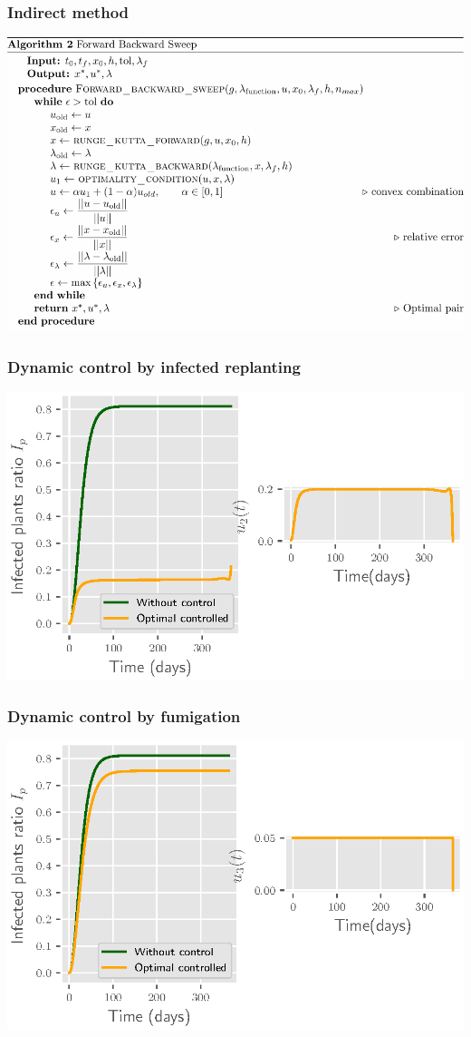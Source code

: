 	\begin{frame}[plain]\frametitle{Indirect method}
		\includegraphics[width=1\linewidth]{Feathergraphics/fbs_algorithm.pdf}
	\end{frame}
	
	\begin{frame}[plain]
		\frametitle{Dynamic control by infected replanting}
			\centering	
			\includegraphics[]{Feathergraphics/figure_1_tomato_one_control.eps}	
	\end{frame}

	\begin{frame}[plain]
	\frametitle{Dynamic control by fumigation}
		\centering	
		\includegraphics[]{Feathergraphics/one_control_simulation_1.eps}	
\end{frame}


